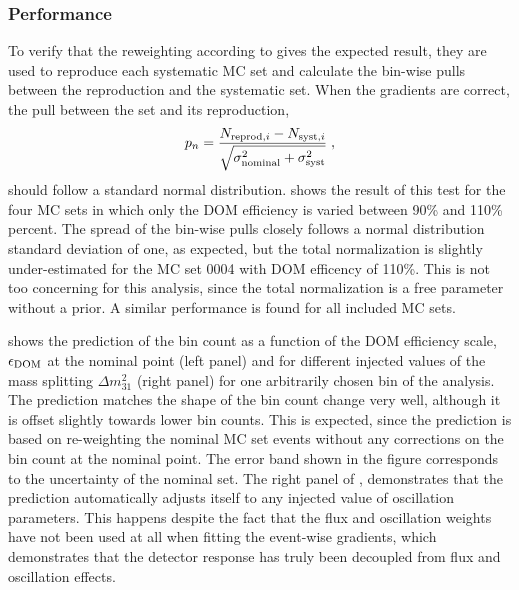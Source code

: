 \subsubsection{Performance}
To verify that the reweighting according to  gives the expected result, they are used to reproduce each systematic MC set and calculate the bin-wise pulls between the reproduction and the systematic set.
When the gradients are correct, the pull between the set and its reproduction,
$$p_n = \frac{N_{\mathrm{reprod}, i} - N_{\mathrm{syst}, i}}{\sqrt{\sigma^2_{\rm nominal} + \sigma^2_{\rm syst}}}\;,$$
should follow a standard normal distribution.
 shows the result of this test for the four MC sets in which only the DOM efficiency is varied between 90\% and 110\% percent.
The spread of the bin-wise pulls closely follows a normal distribution standard deviation of one, as expected, but the total normalization is slightly under-estimated for the MC set 0004 with DOM efficency of 110\%.
This is not too concerning for this analysis, since the total normalization is a free parameter without a prior.
A similar performance is found for all included MC sets.

 shows the prediction of the bin count as a function of the DOM efficiency scale, $\epsilon_{\rm DOM}$ at the nominal point (left panel) and for different injected values of the mass splitting $\Delta m^2_{31}$ (right panel) for one arbitrarily chosen bin of the analysis.
The prediction matches the shape of the bin count change very well, although it is offset slightly towards lower bin counts.
This is expected, since the prediction is based on re-weighting the nominal MC set events without any corrections on the bin count at the nominal point.
The error band shown in the figure corresponds to the uncertainty of the nominal set.
The right panel of , demonstrates that the prediction automatically adjusts itself to any injected value of oscillation parameters.
This happens despite the fact that the flux and oscillation weights have not been used at all when fitting the event-wise gradients, which demonstrates that the detector response has truly been decoupled from flux and oscillation effects.

